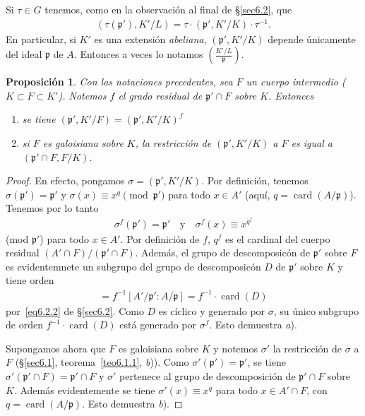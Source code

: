 \documentclass[10pt,oneside,bibtotoc,smallheadings,leqno,a5paper,DIV=12]{scrbook}
\newcommand{\idl}[1]{\mathfrak{#1}}
\DeclareMathOperator{\card}{card}
\numberwithin{equation}{section}
\theoremstyle{defi}
\theoremstyle{enonce}
\newtheorem{proposition}{Proposici\'on}
\theoremstyle{rem}
\numberwithin{theorem}{section}
\numberwithin{proposition}{section}
\numberwithin{definition}{section}
\numberwithin{lemma}{section}
\numberwithin{corollary}{section}
\numberwithin{example}{section}
\numberwithin{footnote}{section}%
\begin{document}
Si $\tau\in G$ tenemos, como en la observaci\'on al final de \S\ref{sec6.2}, que
\begin{gather}
(\tau(\idl{p}'),K'/L) = \tau\cdot(\idl{p}',K'/K)\cdot\tau^{-1}.
\end{gather}
En particular, si $K'$ es una extensi\'on {\em abeliana,} $(\idl{p'},K'/K)$ depende \'unicamente del
ideal $\idl{p}$ de $A$. Entonces a veces lo notamos $\left(\frac{K'/L}{\idl{p}}\right)$.

\begin{proposition}\label{prop6.3.1}
Con las notaciones precedentes, sea $F$ un cuerpo intermedio {\upshape(}$K\subset F\subset K'${\upshape).}
Notemos $f$ el grado residual de $\idl{p}'\cap F$ sobre $K$. Entonces
\begin{enumerate}
\item se tiene $(\idl{p}',K'/F) = (\idl{p}',K'/K)^{f}$
\item si $F$ es galoisiana sobre $K$, la restricci\'on de $(\idl{p}',K'/K)$ a $F$ es igual a
$(\idl{p}'\cap F,F/K)$.
\end{enumerate}
\end{proposition}

\begin{proof}
En efecto, pongamos $\sigma = (\idl{p}',K'/K)$. Por definici\'on, tenemos $\sigma(\idl{p}')=\idl{p}'$ y
$\sigma(x) \equiv x^{q}\pmod{\idl{p}'}$ para todo $x\in A'$ (aqu\'i, $q = \card(A/\idl{p})$). Tenemos por lo tanto
\begin{gather*}
\sigma^{f}(\idl{p}') = \idl{p}'\quad\text{y}\quad\sigma^{f}(x)\equiv x^{q^{f}}
\end{gather*}
(mod $\idl{p}'$) para todo $x\in A'$. Por definici\'on de $f$, $q^{f}$ es el cardinal del cuerpo residual
$(A'\cap F)/(\idl{p}'\cap F)$. Adem\'as, el grupo de descomposic\'on de $\idl{p}'$ sobre $F$
es evidentemnete un subgrupo del grupo de descomposic\'on $D$ de $\idl{p}'$ sobre $K$ y tiene orden
\begin{gather*}
[A'/\idl{p}':(A'\cap F)/(\idl{p}'\cap F)] = f^{-1}[A'/\idl{p}':A/\idl{p}] = f^{-1}\cdot\card(D)
\end{gather*}
por~\eqref{eq6.2.2} de \S\ref{sec6.2}. Como $D$ es c\'iclico y generado por $\sigma$, su \'unico subgrupo de orden $f^{-1}\cdot\card(D)$
est\'a generado por $\sigma^{f}$. Esto demuestra {\itshape a}).

Supongamos ahora que $F$ es galoisiana sobre $K$ y notemos $\sigma'$ la restricci\'on de $\sigma$ a $F$
(\S\ref{sec6.1}, teorema~\ref{teo6.1.1}, {\itshape b})). Como $\sigma'(\idl{p}') = \idl{p}'$, se tiene $\sigma'(\idl{p}'\cap F)=\idl{p}'\cap F$
y $\sigma'$ pertenece al grupo de descomposici\'on de $\idl{p}'\cap F$ sobre $K$. Adem\'as evidentemente
se tiene $\sigma'(x)\equiv x^{q}$ para todo $x\in A'\cap F$, con $q = \card(A/\idl{p})$. Esto demuestra {\itshape b}).
\end{proof}
\end{document}
